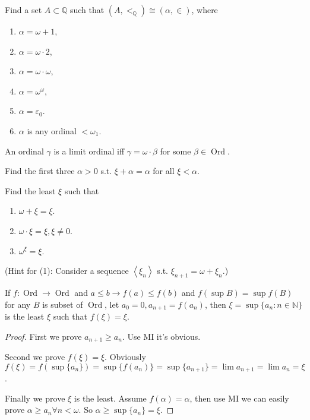 \documentclass{ctexart}
\DeclareMathOperator{\ord}{Ord}
\newcommand{\N}{\mathbb{N}}
\begin{document}
\begin{problem}
Find a set $A \subset \mathbb{Q}$ such that $\left(A,<_{\mathbb{Q}}\right) \cong(\alpha, \in)$, where
\begin{enumerate}[label=\alph*,ref=\theproblem.\alph*]
\item  $\alpha=\omega+1$,
\item  $\alpha=\omega \cdot 2$,
\item  $\alpha=\omega \cdot \omega$,
\item  $\alpha=\omega^\omega$,
\item  $\alpha=\varepsilon_0$.
\item  $\alpha$ is any ordinal $<\omega_1$.
\end{enumerate}
\end{problem}



\begin{problem}
An ordinal $\gamma$ is a limit ordinal iff $\gamma=\omega \cdot \beta$ for some $\beta \in\ord$.
\end{problem}



\begin{problem}
Find the first three $\alpha>0$ s.t. $\xi+\alpha=\alpha$ for all $\xi<\alpha$.
\end{problem}



\begin{problem}
Find the least $\xi$ such that
\begin{enumerate}[label=\alph*,ref=\theproblem.\alph*]
\item  $\omega+\xi=\xi$.
\item  $\omega \cdot \xi=\xi, \xi \neq 0$.
\item  $\omega^{\xi}=\xi$.
\end{enumerate}
(Hint for (1): Consider a sequence $\left\langle\xi_n\right\rangle$ s.t. $\xi_{n+1}=\omega+\xi_n$.)
\end{problem}
\begin{lemma}\label{lem:f}
If $f:\ord\to\ord$ and $a\leq b\to f(a)\leq f(b)$ and $f(\sup B)=\sup f(B)$ for any $B$ is subset of $\ord$, let $a_0=0,a_{n+1}=f(a_n)$, then $\xi=\sup\{a_n:n\in\N\}$ is the least $\xi$ such that $f(\xi)=\xi$.
\end{lemma}
\begin{proof}
First we prove $a_{n+1}\geq a_n$. Use MI it's obvious.

Second we prove $f(\xi)=\xi$. Obviously $f(\xi)=f(\sup\{a_n\})=\sup\{f(a_n)\}=\sup\{a_{n+1}\}=\lim a_{n+1}=\lim a_n=\xi$.

Finally we prove $\xi$ is the least. Assume $f(\alpha)=\alpha$, then use MI we can easily prove $\alpha\geq a_n\forall n<\omega$. So $\alpha\geq \sup\{a_n\}=\xi$.
\end{proof}
\end{document}
